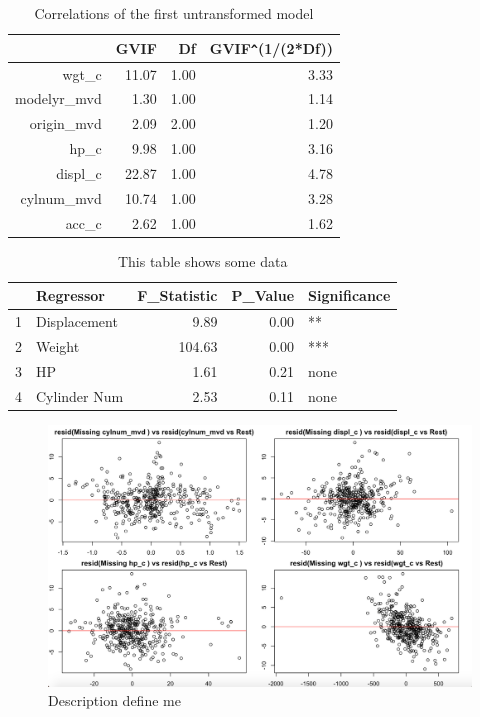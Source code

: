 \documentclass{article}
\begin{document}
\begin{table}[ht]
\centering
\begin{tabular}{rrrr}
  \hline
 & GVIF & Df & GVIF\verb|^|(1/(2*Df)) \\ 
  \hline
wgt\_c & 11.07 & 1.00 & 3.33 \\ 
  modelyr\_mvd & 1.30 & 1.00 & 1.14 \\ 
  origin\_mvd & 2.09 & 2.00 & 1.20 \\ 
  hp\_c & 9.98 & 1.00 & 3.16 \\ 
  displ\_c & 22.87 & 1.00 & 4.78 \\ 
  cylnum\_mvd & 10.74 & 1.00 & 3.28 \\ 
  acc\_c & 2.62 & 1.00 & 1.62 \\ 
   \hline
\end{tabular}
\caption{Correlations of the first untransformed model}
\label{tab:myfirsttable}
\end{table}

\begin{table}[ht]
\centering
\begin{tabular}{rlrrl}
  \hline
 & Regressor & F\_Statistic & P\_Value & Significance \\ 
  \hline
1 & Displacement & 9.89 & 0.00 & ** \\ 
  2 & Weight & 104.63 & 0.00 & *** \\ 
  3 & HP & 1.61 & 0.21 & none \\ 
  4 & Cylinder Num & 2.53 & 0.11 & none \\ 
   \hline
\end{tabular}
\caption{This table shows some data}
\label{tab:myfirsttable}
\end{table}

\clearpage
\newpage 

\begin{figure}
	\centering
	\includegraphics[width=1\linewidth]{11-14p_PrRgall4}
	\caption[TOC Define Me]
	{Description define me}
\end{figure}
\end{document}
